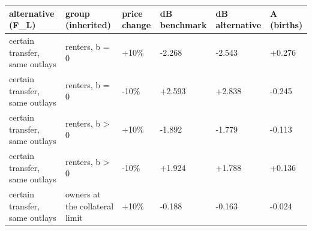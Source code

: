 \begingroup\small
\setlength{\tabcolsep}{3pt}
\renewcommand{\arraystretch}{1.04}
\begin{tabularx}{\linewidth}{XXXXXX}
\toprule
alternative (F\_L) & group (inherited) & price change & dB benchmark & dB alternative & A (births) \\
\midrule
certain transfer, same outlays & renters, b = 0 & +10\% & -2.268 & -2.543 & +0.276 \\
certain transfer, same outlays & renters, b = 0 & -10\% & +2.593 & +2.838 & -0.245 \\
certain transfer, same outlays & renters, b \textgreater{} 0 & +10\% & -1.892 & -1.779 & -0.113 \\
certain transfer, same outlays & renters, b \textgreater{} 0 & -10\% & +1.924 & +1.788 & +0.136 \\
certain transfer, same outlays & owners at the collateral limit & +10\% & -0.188 & -0.163 & -0.024 \\
\bottomrule
\end{tabularx}
\endgroup
